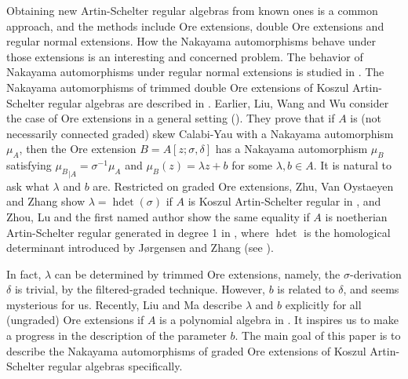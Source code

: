 \documentclass[a4paper,10pt]{amsart}
\theoremstyle{definition}
\numberwithin{equation}{section}
\DeclareMathOperator{\hdet}{hdet}
\begin{document}
Obtaining new Artin-Schelter regular algebras from known ones is a common approach, and the methods include Ore extensions, double Ore extensions and regular normal extensions. How the Nakayama automorphisms behave under those extensions is an interesting and concerned problem. The behavior of Nakayama automorphisms under regular normal extensions is studied in \cite{RRZ1,ZSL}. The Nakayama automorphisms of trimmed double Ore extensions of Koszul Artin-Schelter regular algebras are described in \cite{ZVZ}. Earlier, Liu, Wang and Wu consider the case of Ore extensions in a general setting (\cite{LWW}). They prove that if $A$ is (not necessarily connected graded) skew Calabi-Yau with a Nakayama automorphism $\mu_A$, then the Ore extension $B=A[z;{\sigma},\delta]$ has a Nakayama automorphism $\mu_B$ satisfying ${\mu_B}_{\mid A}={\sigma}^{-1}\mu_A$ and $\mu_B(z)=\lambda z+b$ for some $\lambda,b\in A$. It is natural to ask what $\lambda$ and $b$ are. Restricted on graded Ore extensions, Zhu, Van Oystaeyen and Zhang show $\lambda=\hdet({\sigma})$ if $A$ is Koszul Artin-Schelter regular in \cite{ZVZ}, and Zhou, Lu and the first named author show the same equality if $A$ is noetherian Artin-Schelter regular generated in degree 1 in \cite{SZL}, where $\hdet$ is the homological determinant introduced by  J{\o}rgensen and Zhang (see \cite{JZ}).

In fact, $\lambda$ can be determined by trimmed Ore extensions, namely, the ${\sigma}$-derivation ${\delta}$ is trivial, by the filtered-graded technique. However, $b$ is related to ${\delta}$, and seems mysterious for us. Recently, Liu and Ma describe $\lambda$ and $b$ explicitly for all (ungraded) Ore extensions if $A$ is a polynomial algebra in \cite{LM}. It inspires us to  make a progress in the description of the parameter $b$. The main goal of this paper is to describe the Nakayama automorphisms of graded Ore extensions of Koszul Artin-Schelter regular algebras specifically.
\end{document}
